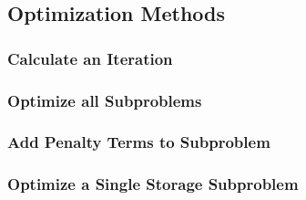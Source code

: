 \subsection{Optimization Methods}

\subsubsection{Calculate an Iteration}
\label{sec:appendix:jl:optimization:calculate-iteration}



\subsubsection{Optimize all Subproblems}
\label{sec:appendix:jl:optimization:optimize-all-subproblems}



\subsubsection{Add Penalty Terms to Subproblem}
\label{sec:appendix:jl:optimization:add-penalty-terms}




\subsubsection{Optimize a Single Storage Subproblem}
\label{sec:appendix:jl:optimization:sub-storage}




